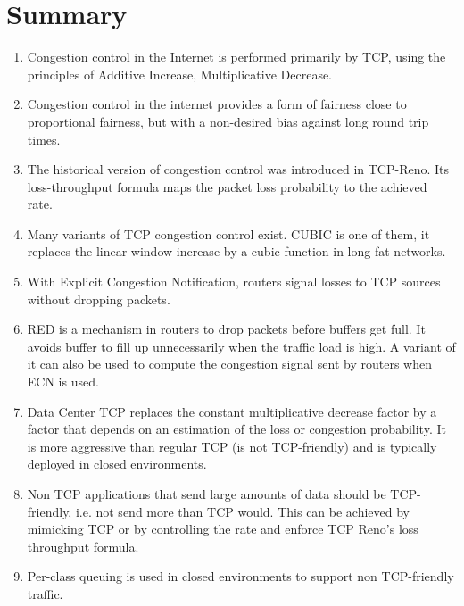 \section{Summary}
\begin{enumerate}
\item Congestion control in the Internet is performed primarily by
TCP, using the principles of Additive Increase, Multiplicative
Decrease.
 \item Congestion control in the internet provides a
form of fairness close to proportional fairness, but with a
non-desired bias against long round trip times.
\item The historical version of congestion control was introduced in TCP-Reno. Its loss-throughput formula maps the packet loss probability to the achieved rate.
\item Many variants of TCP congestion control exist. CUBIC is one of them, it replaces the linear window increase by a cubic function in long fat networks.
\item With Explicit Congestion Notification, routers signal losses to TCP sources without dropping packets.
\item RED is a mechanism in routers to drop packets before
 buffers get full. It avoids buffer to fill up unnecessarily when
 the traffic load is high. A variant of it can also be used to compute the congestion signal sent by routers when ECN is used.
 \item Data Center TCP replaces the constant multiplicative decrease factor by a factor that depends on an estimation of the loss or congestion probability. It is more aggressive than regular TCP (is not TCP-friendly) and is typically deployed in closed environments.
 \item Non TCP applications that send large amounts of data should
 be TCP-friendly, i.e. not send more than TCP would. This can be
 achieved by mimicking TCP or by controlling the rate and enforce TCP Reno's loss throughput formula.
 \item Per-class queuing is used in closed environments to support non TCP-friendly traffic.

 \end{enumerate}
%
%
%
%
%
%

%
%
